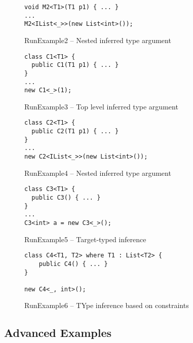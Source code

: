 \begin{figure}[h]
\begin{lstlisting}[style=csharp, showstringspaces=false]
void M2<T1>(T1 p1) { ... }
...
M2<IList<_>>(new List<int>());
\end{lstlisting}
\caption{RunExample2 -- Nested inferred type argument}
\label{img101:example2}
\end{figure}

\begin{figure}[h]
\begin{lstlisting}[style=csharp, showstringspaces=false]
class C1<T1> {
  public C1(T1 p1) { ... }
}
...
new C1<_>(1);
\end{lstlisting}
\caption{RunExample3 -- Top level inferred type argument}
\label{img102:example3}
\end{figure}

\begin{figure}[h]
\begin{lstlisting}[style=csharp, showstringspaces=false]
class C2<T1> {
  public C2(T1 p1) { ... }
}
...
new C2<IList<_>>(new List<int>());
\end{lstlisting}
\caption{RunExample4 -- Nested inferred type argument}
\label{img103:example4}
\end{figure}

\begin{figure}[h]
\begin{lstlisting}[style=csharp, showstringspaces=false]
class C3<T1> {
  public C3() { ... }
}
...
C3<int> a = new C3<_>();
\end{lstlisting}
\caption{RunExample5 -- Target-typed inference}
\label{img104:example5}
\end{figure}

\begin{figure}[h]
\begin{lstlisting}[style=csharp, showstringspaces=false]
class C4<T1, T2> where T1 : List<T2> {
    public C4() { ... }
}
    
new C4<_, int>();
\end{lstlisting}
\caption{RunExample6 -- TYpe inference based on constraints}
\label{img105:example6}
\end{figure}

\subsection{Advanced Examples}

